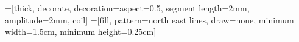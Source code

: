 
=[thick, decorate, decoration={aspect=0.5, segment length=2mm, amplitude=2mm, coil}]
=[fill, pattern=north east lines, draw=none, minimum width=1.5cm, minimum height=0.25cm]

